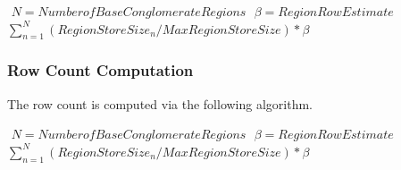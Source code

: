 $ $
$ N=Number of Base Conglomerate Regions$
$ $
$ \beta=Region Row Estimate $
$ $
$\sum_{n=1}^{N}(RegionStoreSize_n/MaxRegionStoreSize)*\beta$
$ $

\subsubsection{Row Count Computation}

The row count is computed via the following algorithm.

$ $
$ N=Number of Base Conglomerate Regions$
$ $
$ \beta=Region Row Estimate $
$ $
$\sum_{n=1}^{N}(RegionStoreSize_n/MaxRegionStoreSize)*\beta$
$ $


